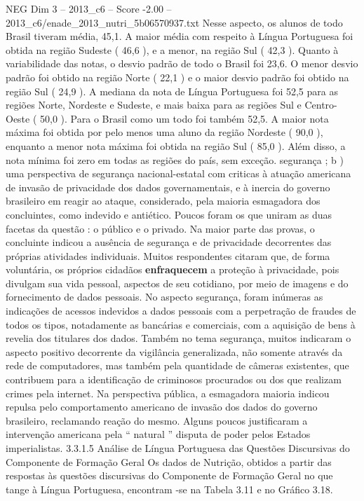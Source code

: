 \begin{textsample}{NEG Dim 3 – 2013\_c6 – Score -2.00 – 2013\_c6/enade\_2013\_nutri\_5b06570937.txt}
Nesse aspecto, os alunos de todo Brasil tiveram média, 45,1.
A maior média com respeito à Língua Portuguesa foi obtida na região Sudeste ( 46,6 ), e a menor, na região Sul ( 42,3 ).
Quanto à variabilidade das notas, o desvio padrão de todo o Brasil foi 23,6.
O menor desvio padrão foi obtido na região Norte ( 22,1 ) e o maior desvio padrão foi obtido na região Sul ( 24,9 ).
A mediana da nota de Língua Portuguesa foi 52,5 para as regiões Norte, Nordeste e Sudeste, e mais baixa para as regiões Sul e Centro-Oeste ( 50,0 ).
Para o Brasil como um todo foi também 52,5.
A maior nota máxima foi obtida por pelo menos uma aluno da região Nordeste ( 90,0 ), enquanto a menor nota máxima foi obtida na região Sul ( 85,0 ).
Além disso, a nota mínima foi zero em todas as regiões do país, sem exceção. segurança ; b ) uma perspectiva de segurança nacional-estatal com criticas à atuação americana de invasão de privacidade dos dados governamentais, e à inercia do governo brasileiro em reagir ao ataque, considerado, pela maioria esmagadora dos concluintes, como indevido e antiético.
Poucos foram os que uniram as duas facetas da questão : o público e o privado.
Na maior parte das provas, o concluinte indicou a ausência de segurança e de privacidade decorrentes das próprias atividades individuais.
Muitos respondentes citaram que, de forma voluntária, os próprios cidadãos \textbf{enfraquecem} a proteção à privacidade, pois divulgam sua vida pessoal, aspectos de seu cotidiano, por meio de imagens e do fornecimento de dados pessoais.
No aspecto segurança, foram inúmeras as indicações de acessos indevidos a dados pessoais com a perpetração de fraudes de todos os tipos, notadamente as bancárias e comerciais, com a aquisição de bens à revelia dos titulares dos dados.
Também no tema segurança, muitos indicaram o aspecto positivo decorrente da vigilância generalizada, não somente através da rede de computadores, mas também pela quantidade de câmeras existentes, que contribuem para a identificação de criminosos procurados ou dos que realizam crimes pela internet.
Na perspectiva pública, a esmagadora maioria indicou repulsa pelo comportamento americano de invasão dos dados do governo brasileiro, reclamando reação do mesmo.
Alguns poucos justificaram a intervenção americana pela “ natural ” disputa de poder pelos Estados imperialistas. 3.3.1.5 Análise de Língua Portuguesa das Questões Discursivas do Componente de Formação Geral Os dados de Nutrição, obtidos a partir das respostas às questões discursivas do Componente de Formação Geral no que tange à Língua Portuguesa, encontram -se na Tabela 3.11 e no Gráfico 3.18.

\end{textsample}
